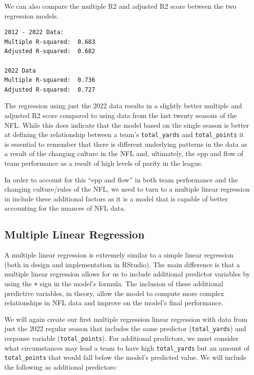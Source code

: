 \documentclass[
  letterpaper,
]{krantz}
\begin{document}
We can also compare the multiple R2 and adjusted R2 score between the
two regression models.

\begin{verbatim}
2012 - 2022 Data:
Multiple R-squared:  0.683
Adjusted R-squared:  0.682

2022 Data
Multiple R-squared:  0.736
Adjusted R-squared:  0.727
\end{verbatim}

The regression using just the 2022 data results in a slightly better
multiple and adjusted R2 score compared to using data from the last
twenty seasons of the NFL. While this does indicate that the model based
on the single season is better at defining the relationship between a
team's \texttt{total\_yards} and \texttt{total\_points} it is essential
to remember that there is different underlying patterns in the data as a
result of the changing culture in the NFL and, ultimately, the epp and
flow of team performance as a result of high levels of parity in the
league.

In order to account for this ``epp and flow'' in both team performance
and the changing culture/rules of the NFL, we need to turn to a multiple
linear regression in include these additional factors as it is a model
that is capable of better accounting for the nuances of NFL data.

\hypertarget{multiple-linear-regression}{%
\subsection{Multiple Linear
Regression}\label{multiple-linear-regression}}

A multiple linear regression is extremely similar to a simple linear
regression (both in design and implementation in RStudio). The main
difference is that a multiple linear regression allows for us to include
additional predictor variables by using the \texttt{+} sign in the
model's formula. The inclusion of these additional predictive variables,
in theory, allow the model to compute more complex relationships in NFL
data and improve on the model's final performance.

We will again create our first multiple regression linear regression
with data from just the 2022 regular season that includes the same
predictor (\texttt{total\_yards}) and response variable
(\texttt{total\_points}). For additional predictors, we must consider
what circumstances may lead a team to have high \texttt{total\_yards}
but an amount of \texttt{total\_points} that would fall below the
model's predicted value. We will include the following as additional
predictors:
\end{document}
